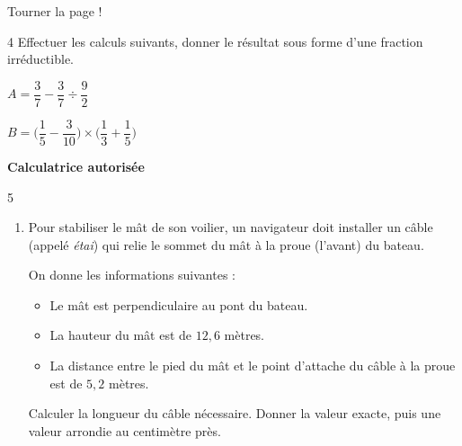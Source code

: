 \documentclass[a4paper]{book}
\begin{document}
{\vfill
\hfill Tourner la page !


\newpage


    \begin{exerciceNote}{4}
        Effectuer les calculs suivants, donner le résultat sous forme d'une fraction irréductible.

        \begin{minipage}{0.45\linewidth}
            $A = \dfrac{3}{7}-\dfrac{3}{7}\div\dfrac{9}{2}$
            \vspace{4cm}
        \end{minipage}
        \hfill\vline\hfill
        \begin{minipage}{0.45\linewidth}
            $B = \bigg(\dfrac{1}{5}-\dfrac{3}{10}\bigg)\times\bigg(\dfrac{1}{3}+\dfrac{1}{5}\bigg)$
            \vspace{4cm}
        \end{minipage}   
    \end{exerciceNote}


\newpage

\raggedright
\NomPrenom 

\medskip

\textbf{Calculatrice autorisée}

    \begin{exerciceNote}{5}
        \begin{enumerate}[leftmargin=*]
            \item Pour stabiliser le mât de son voilier, un navigateur doit installer un câble (appelé \textit{étai}) qui relie le sommet du mât à la proue (l'avant) du bateau.
            
            \begin{minipage}{0.5\linewidth}
                On donne les informations suivantes :
                \begin{itemize}
                    \item Le mât est perpendiculaire au pont du bateau.
                    \item La hauteur du mât est de $12,6$ mètres.
                    \item La distance entre le pied du mât et le point d'attache du câble à la proue est de $5,2$ mètres.
                \end{itemize}
            
                Calculer la longueur du câble nécessaire. Donner la valeur exacte, puis une valeur arrondie au centimètre près.
                

\end{minipage}
\end{enumerate}
\end{exerciceNote}}
\end{document}
